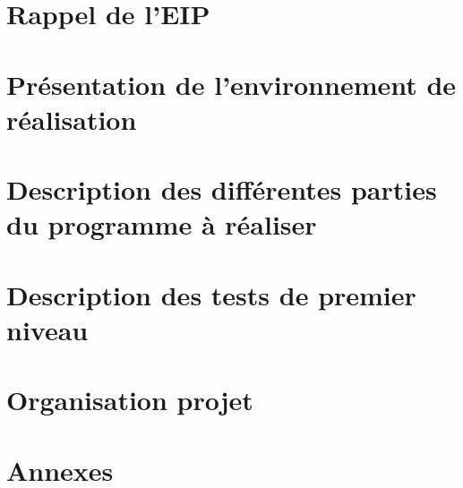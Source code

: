 \documentclass[11pt]{report}
\begin{document}
\tableofcontents
{}
\thispagestyle{empty}

\chapter{Rappel de l'EIP}
\thispagestyle{EIP} %
\setcounter{page}{1} %



\chapter{Présentation de l'environnement de réalisation}
\thispagestyle{EIP} %








\chapter{Description des différentes parties du programme à réaliser}
\thispagestyle{EIP} %


\chapter{Description des tests de premier niveau}
\thispagestyle{EIP} %


\chapter{Organisation projet}
\thispagestyle{EIP} %


\chapter{Annexes}
\thispagestyle{EIP} %

\end{document}

